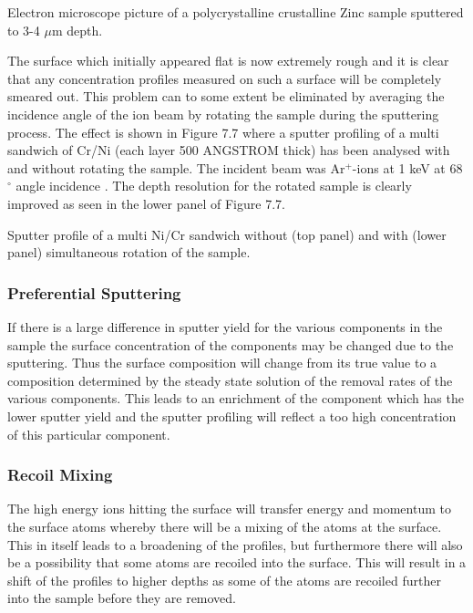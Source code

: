  \vspace{11cm}

  Electron microscope picture of a
 polycrystalline crustalline Zinc sample sputtered to 3-4 $\mu$m depth.\\

 \newpage


 The surface which initially appeared flat is now extremely
 rough and it is clear that any concentration profiles
 measured on such a surface will be completely smeared out.
 This problem can to some extent be eliminated by averaging
 the incidence angle of the ion beam by rotating the sample
 during the sputtering process. The effect is shown in Figure
 7.7 where a sputter profiling of a multi sandwich of Cr/Ni
 (each layer 500 ANGSTROM thick) has been analysed with and without
 rotating the sample. The incident beam was Ar$^{+}$-ions at
 1 keV at 68$^{\circ}$ angle incidence \cite{zalar}. The
 depth resolution for the rotated sample is clearly improved
 as seen in the lower panel of Figure 7.7.


  \vspace{11cm}

  Sputter profile of a multi Ni/Cr
 sandwich without (top panel) and with (lower panel)
 simultaneous rotation of the sample.\\


 \subsubsection{Preferential Sputtering}

 If there is a large difference in sputter yield for the
 various components in the sample the surface concentration
 of the components may be changed due to the sputtering. Thus
 the surface composition will change from its true value to a
 composition determined by the steady state solution of the
 removal rates of the various components. This leads to an
 enrichment of the component which has the lower sputter
 yield and the sputter profiling will reflect a too high
 concentration of this particular component.

 \subsubsection{Recoil Mixing}
 The high energy ions hitting the surface will transfer
 energy and momentum to the surface atoms whereby there will
 be a mixing of the atoms at the surface. This in itself leads
 to a broadening of the profiles, but furthermore there will
 also be a possibility that some atoms are recoiled into the
 surface. This will result in a shift of the profiles to
 higher depths as some of the atoms are recoiled further into
 the sample before they are removed.

